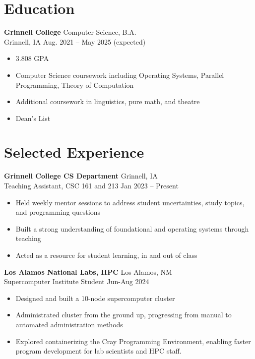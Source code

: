 \documentclass[12pt]{article}
\newcommand{\entry}[4]{{{\textbf{#1}}} \hfill #3 \\ #2 \hfill #4}
\begin{document}
\noindent %
\begin{minipage}[t]{0.63\textwidth}

  \section{Education}
  \entry{Grinnell College}{Grinnell, IA}{Computer Science, B.A.}{Aug. 2021 -- May 2025 (expected)}
  \begin{itemize}[noitemsep,leftmargin=3.5mm,rightmargin=0mm,topsep=6pt]
    \item 3.808 GPA
    \item Computer Science coursework including Operating Systems, Parallel Programming, Theory of Computation
    \item Additional coursework in linguistics, pure math, and theatre
    \item Dean's List %
  \end{itemize}


  \section{Selected Experience}
  \entry{Grinnell College CS Department}{Teaching Assistant, CSC 161 and 213}{Grinnell, IA}{Jan 2023 -- Present}
  \begin{itemize}[noitemsep,leftmargin=3.5mm,rightmargin=0mm,topsep=6pt]
    \item Held weekly mentor sessions to address student uncertainties, study topics, and programming questions
    \item Built a strong understanding of foundational and operating systems through teaching
    \item Acted as a resource for student learning, in and out of class
  \end{itemize}

  \medskip

  \entry{Los Alamos National Labs, HPC}{Supercomputer Institute Student}{Los Alamos, NM}{Jun-Aug 2024}
  \begin{itemize}[noitemsep,leftmargin=3.5mm,rightmargin=0mm,topsep=6pt]
    \item Designed and built a 10-node supercomputer cluster
    \item Administrated cluster from the ground up, progressing from manual to automated administration methods
    \item Explored containerizing the Cray Programming Environment, enabling faster program development for lab scientists
      and HPC staff.
  \end{itemize}


\end{minipage}
\end{document}

